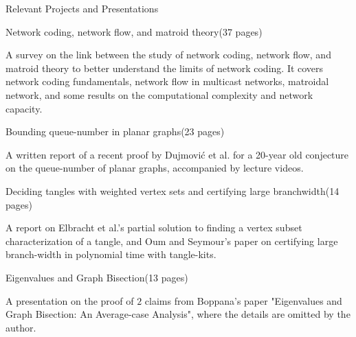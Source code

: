 \documentclass{cv}
\begin{document}
\begin{rSection}{Relevant Projects and Presentations}
	
\begin{rSubsection}{Network coding, network flow, and matroid theory}{(37 pages)}{}{}
	\item A survey on the link between the study of network coding, network flow, and matroid theory 
	to better understand the limits of network coding. It covers network coding fundamentals, network flow in 
	multicast networks, matroidal network, and some results on the computational complexity and network capacity.
\end{rSubsection}

\begin{rSubsection}{Bounding queue-number in planar graphs}{(23 pages)}{}{}
	\item A written report of a recent proof by Dujmovi\'{c} et al. for a 20-year old conjecture on the queue-number of planar graphs, 
	accompanied by lecture videos.
\end{rSubsection}

\begin{rSubsection}{Deciding tangles with weighted vertex sets and certifying large branchwidth}{(14 pages)}{}{}
	\item A report on Elbracht et al.'s partial solution to finding a vertex subset characterization of a tangle, and Oum and 
	Seymour's paper on certifying large branch-width in polynomial time with tangle-kits.
\end{rSubsection}

\begin{rSubsection}{Eigenvalues and Graph Bisection}{(13 pages)}{}{}
	\item A presentation on the proof of $2$ claims from Boppana's paper "Eigenvalues and Graph Bisection: An Average-case Analysis", 
	where the details are omitted by the author.
\end{rSubsection}
\end{rSection}
\end{document}
